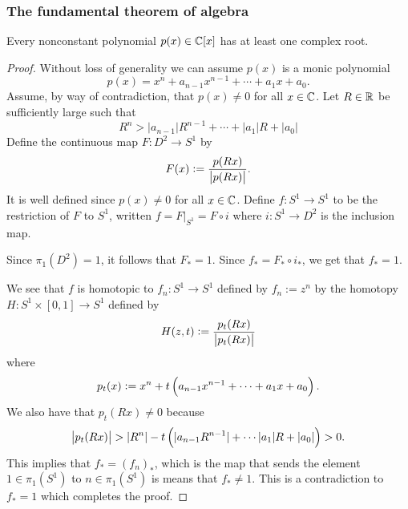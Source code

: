 \documentclass[11pt,a4paper]{article}
\begin{document}
\subsubsection{The fundamental theorem of algebra}
\begin{theorem}
  Every nonconstant polynomial $p(x) \in \mathbb{C}[x]$ has at least one complex
  root.
\end{theorem}
\begin{proof}
  Without loss of generality we can assume $p(x)$ is a monic polynomial
  \[
    p(x) = x^n + a_{n-1} x^{n-1} + \cdots + a_1 x + a_0.
  \]
  Assume, by way of contradiction, that $p(x) \neq 0$ for all $x \in \mathbb{C}$.
  Let $R \in \mathbb{R}$ be sufficiently large such that
  \[
    R^n > |a_{n-1}| R^{n-1} + \cdots + |a_1| R + |a_0|
  \]
  Define the continuous map $F \colon D^2 \to S^1$ by
  \[
    F(x) := \frac{p(Rx)}{\left\lvert p(Rx)\right\rvert}.
  \]
  It is well defined since $p(x) \neq 0$ for all $x \in \mathbb{C}$.
  Define $f \colon S^1 \to S^1$ to be the restriction of $F$ to $S^1$,
  written $f = F\vert_{S^1} = F \circ i$ where $i \colon S^1 \to D^2$
  is the inclusion map.
  
  Since $\pi_1(D^2) = 1$, it follows that $F_* = 1$.
  Since $f_* = F_* \circ i_*$, we get that $f_* = 1$.

  We see that $f$ is homotopic to $f_n \colon S^1 \to S^1$ defined
  by $f_n := z^n$ by the homotopy $H \colon S^1 \times [0,1] \to S^1$
  defined by
  \[
    H(z,t) := \frac{p_t(Rx)}{\left\lvert p_t(Rx)\right\rvert}
  \]
  where
  \[
    p_t(x) := x^n + t \del{a_{n-1} x^{n-1} + \cdots + a_1 x + a_0}.
  \]
  We also have that $p_t(Rx) \neq 0$ because
  \[
    \abs{p_t(Rx)} >
    |R^n| - t \del{|a_{n-1} R^{n-1}| + \cdots |a_1| R + |a_0|} > 0.
  \]
  This implies that $f_* = (f_{n})_*$,
  which is the map that sends the element
  $1 \in \pi_1(S^1)$ to $n \in \pi_1(S^1)$ is means that $f_* \neq 1$.
  This is a contradiction to $f_* = 1$ which completes the proof.
\end{proof}
\end{document}
